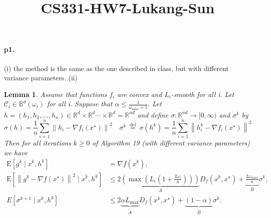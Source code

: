 \documentclass[12pt,a4paper]{article}
\title{CS331-HW7-Lukang-Sun}
\newtheorem*{lemma}{Lemma}
\begin{document}
	\maketitle
	\paragraph{p1.}
	(i) the method is the same as the one described in class, but with different variance parameters.
	\newline
	(ii)
	\begin{lemma}
		 Assume that functions $f_{i}$ are convex and $L_{i}$-smooth for all i. Let $\mathcal{C}_{i} \in \mathbb{B}^{d}(\omega_i)$ for all i. Suppose that $\alpha \leq \frac{1}{\omega_{max}+1} .$ Let $h=\left(h_{1}, h_{2}, \ldots, h_{n}\right) \in \mathbb{R}^{d} \times \mathbb{R}^{d} \cdots \times \mathbb{R}^{d}=\mathbb{R}^{n d}$ and define $\sigma: \mathbb{R}^{n d} \rightarrow[0, \infty)$ and $\sigma^{k}$ by
		$$
		\sigma(h)=\frac{1}{n} \sum_{i=1}^{n}\left\|h_{i}-\nabla f_{i}\left(x^{\star}\right)\right\|^{2} \quad \sigma^{k} \stackrel{\text { def }}{=} \sigma\left(h^{k}\right)=\frac{1}{n} \sum_{i=1}^{n}\left\|h_{i}^{k}-\nabla f_{i}\left(x^{\star}\right)\right\|^{2}
		$$
		Then for all iterations $k \geq 0$ of Algorithm 19 (with different variance parameters) we have
		$$
		\begin{aligned}
			\mathrm{E}\left[g^{k} \mid x^{k}, h^{k}\right] &=\nabla f\left(x^{k}\right), \\
			\mathrm{E}\left[\left\|g^{k}-\nabla f\left(x^{\star}\right)\right\|^{2} \mid x^{k}, h^{k}\right] & \leq 2 \underbrace{\left(\max(L_i(1+\frac{2\omega_i}{n}))\right) }_{A} D_{f}\left(x^{k}, x^{\star}\right)+\underbrace{\frac{2 \omega_{max}}{n}}_{B} \sigma^{k}, \\
			E\left[\sigma^{k+1} \mid x^{k}, h^{k}\right] & \leq 2 \underbrace{\alpha L_{\max }}_{\tilde{A}} D_{f}\left(x^{k}, x^{\star}\right)+\underbrace{(1-\alpha)}_{\tilde{B}} \sigma^{k} .
		\end{aligned}
		$$
	\end{lemma}
\end{document}
